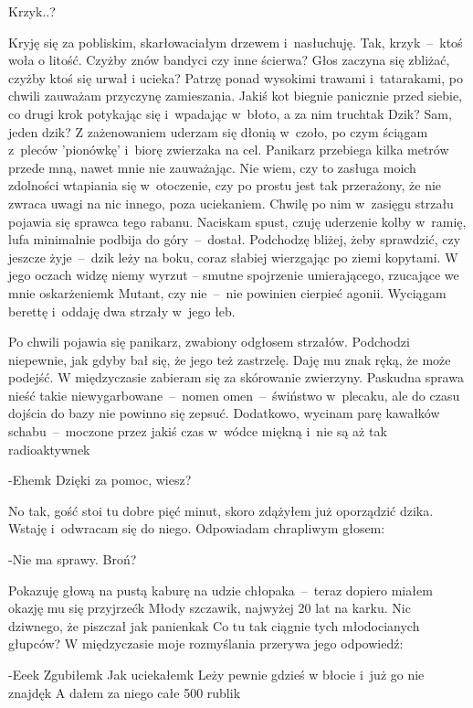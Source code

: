 \documentclass[../MAIN.tex]{subfiles}
\begin{document}
Krzyk..?

Kryję się za pobliskim, skarłowaciałym drzewem i~nasłuchuję.
Tak, krzyk~--~ktoś woła o litość. Czyżby znów bandyci czy inne
ścierwa? Głos zaczyna się zbliżać, czyżby ktoś się urwał i
ucieka? Patrzę ponad wysokimi trawami i~tatarakami, po chwili
zauważam przyczynę zamieszania. Jakiś kot biegnie panicznie
przed siebie, co drugi krok potykając się i~wpadając w~błoto, a
za nim truchta\3k Dzik? Sam, jeden dzik? Z zażenowaniem uderzam
się dłonią w~czoło, po czym ściągam z~pleców 'pionówkę' i~biorę
zwierzaka na cel. Panikarz przebiega kilka metrów przede mną,
nawet mnie nie zauważając. Nie wiem, czy to zasługa moich
zdolności wtapiania się w~otoczenie, czy po prostu jest tak
przerażony, że nie zwraca uwagi na nic innego, poza uciekaniem.
Chwilę po nim w~zasięgu strzału pojawia się sprawca tego
rabanu. Naciskam spust, czuję uderzenie kolby w~ramię, lufa
minimalnie podbija do góry~--~dostał. Podchodzę bliżej, żeby
sprawdzić, czy jeszcze żyje~--~dzik leży na boku, coraz słabiej
wierzgając po ziemi kopytami. W jego oczach widzę niemy wyrzut
– smutne spojrzenie umierającego, rzucające we mnie
oskarżeniem\3k Mutant, czy nie~--~nie powinien cierpieć agonii.
Wyciągam berettę i~oddaję dwa strzały w~jego łeb.

Po chwili pojawia się panikarz, zwabiony odgłosem strzałów.
Podchodzi niepewnie, jak gdyby bał się, że jego też zastrzelę.
Daję mu znak ręką, że może podejść. W międzyczasie zabieram się
za skórowanie zwierzyny. Paskudna sprawa nieść takie
niewygarbowane~--~nomen omen~--~świństwo w~plecaku, ale do
czasu
dojścia do bazy nie powinno się zepsuć. Dodatkowo, wycinam parę
kawałków schabu~--~moczone przez jakiś czas w~wódce miękną
i~nie
są aż tak radioaktywne\3k

-Ehem\3k Dzięki za pomoc, wiesz?

No tak, gość stoi tu dobre pięć minut, skoro zdążyłem już
oporządzić dzika. Wstaję i~odwracam się do niego. Odpowiadam
chrapliwym głosem:

-Nie ma sprawy. Broń?

Pokazuję głową na pustą kaburę na udzie chłopaka~--~teraz
dopiero miałem okazję mu się przyjrzeć\3k Młody szczawik,
najwyżej 20 lat na karku. Nic dziwnego, że piszczał jak
panienka\3k Co tu tak ciągnie tych młodocianych głupców? W
międzyczasie moje rozmyślania przerywa jego odpowiedź:

-Eee\3k Zgubiłem\3k Jak uciekałem\3k Leży pewnie gdzieś w
błocie i~już go nie znajdę\3k A dałem za niego całe 500
rubli\3k
\end{document}
